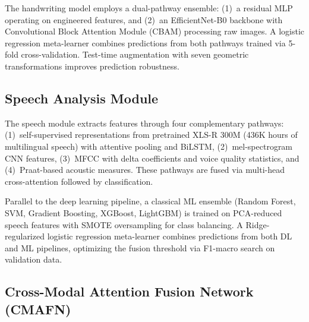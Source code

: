 \documentclass[10pt,conference,letterpaper]{IEEEtran}
\begin{document}
The handwriting model employs a dual-pathway ensemble: (1)~a residual MLP operating on engineered features, and (2)~an EfficientNet-B0 backbone with Convolutional Block Attention Module (CBAM) processing raw images. A logistic regression meta-learner combines predictions from both pathways trained via 5-fold cross-validation. Test-time augmentation with seven geometric transformations improves prediction robustness.

\subsection{Speech Analysis Module}

The speech module extracts features through four complementary pathways: (1)~self-supervised representations from pretrained XLS-R 300M (436K hours of multilingual speech) with attentive pooling and BiLSTM, (2)~mel-spectrogram CNN features, (3)~MFCC with delta coefficients and voice quality statistics, and (4)~Praat-based acoustic measures. These pathways are fused via multi-head cross-attention followed by classification.

Parallel to the deep learning pipeline, a classical ML ensemble (Random Forest, SVM, Gradient Boosting, XGBoost, LightGBM) is trained on PCA-reduced speech features with SMOTE oversampling for class balancing. A Ridge-regularized logistic regression meta-learner combines predictions from both DL and ML pipelines, optimizing the fusion threshold via F1-macro search on validation data.

\subsection{Cross-Modal Attention Fusion Network (CMAFN)}
\end{document}
